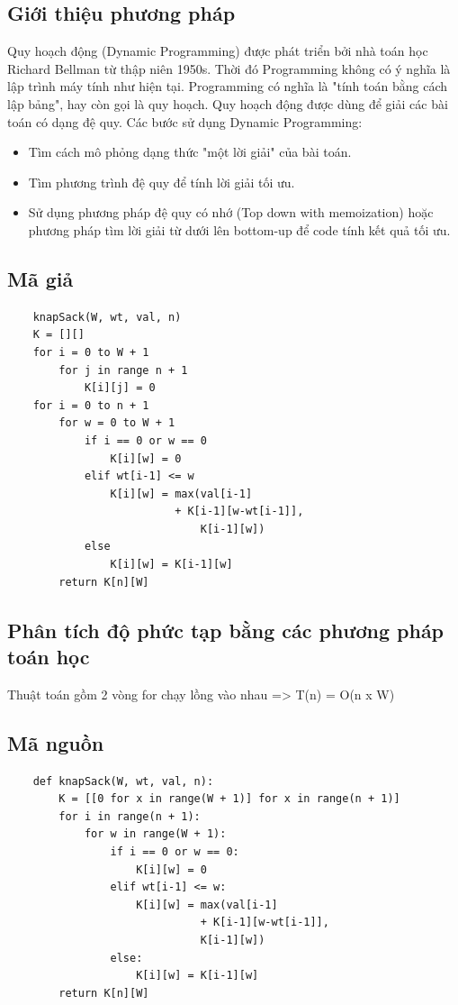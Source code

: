 \documentclass[12pt,a4paper]{report}
\begin{document}
    \subsection{Giới thiệu phương pháp}
    Quy hoạch động (Dynamic Programming) được phát triển bởi nhà toán học Richard Bellman từ thập niên 
    1950s. Thời đó Programming không có ý nghĩa là lập trình máy tính như hiện tại.
    Programming có nghĩa là "tính toán bằng cách lập bảng", hay còn gọi là quy hoạch.
    Quy hoạch động được dùng để giải các bài toán có dạng đệ quy.
    Các bước sử dụng Dynamic Programming:
    \begin{itemize}
        \item Tìm cách mô phỏng dạng thức "một lời giải" của bài toán.
        \item Tìm phương trình đệ quy để tính lời giải tối ưu.
        \item Sử dụng phương pháp đệ quy có nhớ (Top down with memoization) hoặc
    phương pháp tìm lời giải từ dưới lên bottom-up để code tính kết quả tối ưu.
    \end{itemize}
    \subsection{Mã giả}
    \begin{lstlisting}
    knapSack(W, wt, val, n)
	K = [][]
	for i = 0 to W + 1
		for j in range n + 1
			K[i][j] = 0
    for i = 0 to n + 1 
        for w = 0 to W + 1 
            if i == 0 or w == 0 
                K[i][w] = 0
            elif wt[i-1] <= w
                K[i][w] = max(val[i-1] 
                          + K[i-1][w-wt[i-1]],   
                              K[i-1][w]) 
            else
                K[i][w] = K[i-1][w] 
        return K[n][W] 
    \end{lstlisting}
    \subsection{Phân tích độ phức tạp bằng các phương pháp toán học}
    Thuật toán gồm 2 vòng for chạy lồng vào nhau => 
    T(n) = O(n x W)
    \subsection{Mã nguồn}
    \begin{lstlisting}
    def knapSack(W, wt, val, n): 
        K = [[0 for x in range(W + 1)] for x in range(n + 1)] 
        for i in range(n + 1): 
            for w in range(W + 1): 
                if i == 0 or w == 0: 
                    K[i][w] = 0
                elif wt[i-1] <= w: 
                    K[i][w] = max(val[i-1] 
                              + K[i-1][w-wt[i-1]],   
                              K[i-1][w]) 
                else: 
                    K[i][w] = K[i-1][w] 
        return K[n][W] 
    \end{lstlisting}
\end{document}
